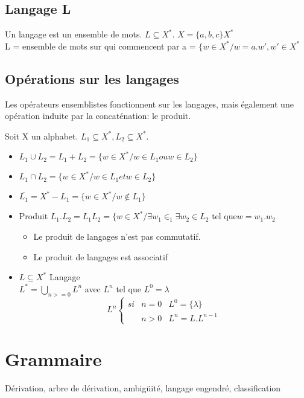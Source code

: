 \documentclass[12pt,a4paper,openany]{book}
\begin{document}
	\section{Langage L}
	Un langage est un ensemble de mots. $L \subseteq X^*$. $X=\{a,b,c\} X^*$\\
	L = ensemble de mots sur  qui commencent par a = $\{w \in X^* / w = a.w', w'\in X^*$
	\section{Opérations sur les langages}
	Les opérateurs ensemblistes fonctionnent sur les langages, mais également une opération induite par la concaténation: le produit.
	
	Soit X un alphabet. $L_1 \subseteq X^*, L_2 \subseteq X^*$.
	\begin{itemize}
		\item $L_1 \cup L_2 = L_1 + L_2 = \{w \in X^*/w \in L_1 ou w\in L_2\}$
		\item $L_1 \cap L_2 = \{w \in X^*/w\in L_1 et w\in L_2\}$
		\item $\overline{L_1} = X^* - L_1 = \{w \in X^* / w \not\in L_1\}$
		\item Produit $L_1 . L_2 = L_1 L_2 = \{w\in X^* / \exists w_1 \in _1 \exists w_2 \in L_2$ tel que$w = w_1 . w_2$ 
	\begin{attention}
		\begin{itemize}
			\item Le produit de langages n'est pas commutatif.
			\item Le produit de langages est associatif
		\end{itemize}
	\end{attention}

\item $L \subseteq X^*$ Langage\\
$L^* = \bigcup_{n >= 0}L^n$ avec $L^n$ tel que $L^0 = \lambda$
	\begin{displaymath}
	L^n
	\left\{\begin{array}{ccc}si & n=0 & L^0=\{\lambda\}\\
		\;&n>0&L^n=L.L^{n-1}
	\end{array}\right.
	\end{displaymath}
	\end{itemize}
	\chapter{Grammaire}
		Dérivation, arbre de dérivation, ambigüité, langage engendré, classification
\end{document}
